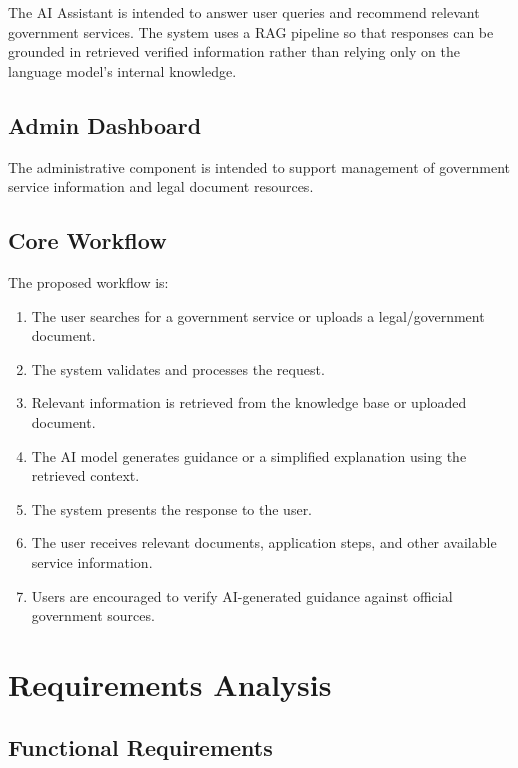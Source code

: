 \documentclass[12pt,a4paper]{report}
\begin{document}
The AI Assistant is intended to answer user queries and recommend relevant government services. The system uses a RAG pipeline so that responses can be grounded in retrieved verified information rather than relying only on the language model's internal knowledge.

\section{Admin Dashboard}

The administrative component is intended to support management of government service information and legal document resources.

\section{Core Workflow}

The proposed workflow is:

\begin{enumerate}[leftmargin=*]
    \item The user searches for a government service or uploads a legal/government document.
    \item The system validates and processes the request.
    \item Relevant information is retrieved from the knowledge base or uploaded document.
    \item The AI model generates guidance or a simplified explanation using the retrieved context.
    \item The system presents the response to the user.
    \item The user receives relevant documents, application steps, and other available service information.
    \item Users are encouraged to verify AI-generated guidance against official government sources.
\end{enumerate}

\chapter{Requirements Analysis}

\section{Functional Requirements}
\end{document}
